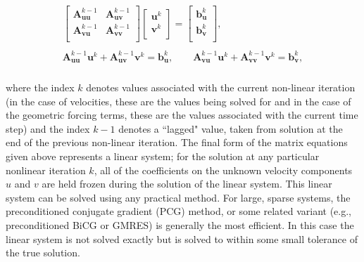 \begin{align*}
\begin{matrix}
  \left[ \begin{matrix}
   \mathbf{A}_{\mathbf{uu}}^{k-1} & \mathbf{A}_{\mathbf{uv}}^{k-1}  \\
   \mathbf{A}_{\mathbf{vu}}^{k-1} & \mathbf{A}_{\mathbf{vv}}^{k-1}  \\
\end{matrix} \right]\left[ \begin{matrix}
   \mathbf{u}^{k}  \\
   \mathbf{v}^{k}  \\
\end{matrix} \right]=\left[ \begin{matrix}
   \mathbf{b}_{\mathbf{u}}^{k}  \\
   \mathbf{b}_{\mathbf{v}}^{k}  \\
\end{matrix} \right], \\ 
   \\ 
  \mathbf{A}_{\mathbf{uu}}^{k-1}\mathbf{u}^{k} + \mathbf{A}_{\mathbf{uv}}^{k-1}\mathbf{v}^{k} =\mathbf{b}_{\mathbf{u}}^{k},
  \quad \quad \mathbf{A}_{\mathbf{vu}}^{k-1}\mathbf{u}^{k} + \mathbf{A}_{\mathbf{vv}}^{k-1}\mathbf{v}^{k} =\mathbf{b}_{\mathbf{v}}^{k}, \\ 
\end{matrix}
\end{align*}

where the index $k$ denotes values associated with the current non-linear iteration (in the case of velocities, these are the values being solved for and in the case of the geometric forcing terms, these are the values associated with the current time step) and the index $k-1$ denotes a ``lagged" value, taken from solution at the end of the previous non-linear iteration. The final form of the matrix equations given above represents a linear system; for the solution at any particular nonlinear iteration $k$, all of the coefficients on the unknown velocity components $u$ and $v$ are held frozen during the solution of the linear system. This linear system can be solved using any practical method. For large, sparse systems, the preconditioned conjugate gradient (PCG) method, or some related variant (e.g., preconditioned BiCG or GMRES) is generally the most efficient. In this case the linear system is not solved exactly but is solved to within some small tolerance of the true solution.


